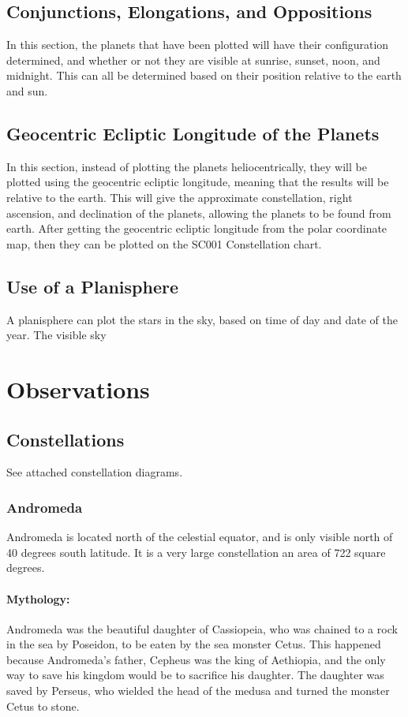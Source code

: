\documentclass{article}
\begin{document}
\subsection{Conjunctions, Elongations, and Oppositions}
In this section, the planets that have been plotted will have their configuration determined, and whether or not they are visible at sunrise, sunset, noon, and midnight.  This can all be determined based on their position relative to the earth and sun.
\subsection{Geocentric Ecliptic Longitude of the Planets}
In this section, instead of plotting the planets heliocentrically, they will be plotted using the geocentric ecliptic longitude, meaning that the results will be relative to the earth.  This will give the approximate constellation, right ascension, and declination of the planets, allowing the planets to be found from earth.  After getting the geocentric ecliptic longitude from the polar coordinate map, then they can be plotted on the SC001 Constellation chart.
\subsection{Use of a Planisphere}
A planisphere can plot the stars in the sky, based on time of day and date of the year.  The visible sky 
\section{Observations}
\subsection{Constellations}
See attached constellation diagrams.

\subsubsection{Andromeda}
Andromeda is located north of the celestial equator, and is only visible north of 40 degrees south latitude. \cite{andromedastarmap} It is a very large constellation an area of 722 square degrees.
\paragraph{Mythology:}
Andromeda was the beautiful daughter of Cassiopeia, who was chained to a rock in the sea by Poseidon, to be eaten by the sea monster Cetus.  This happened because Andromeda's father, Cepheus was the king of Aethiopia, and the only way to save his kingdom would be to sacrifice his daughter.  The daughter was saved by Perseus, who wielded the head of the medusa and turned the monster Cetus to stone.
\end{document}
